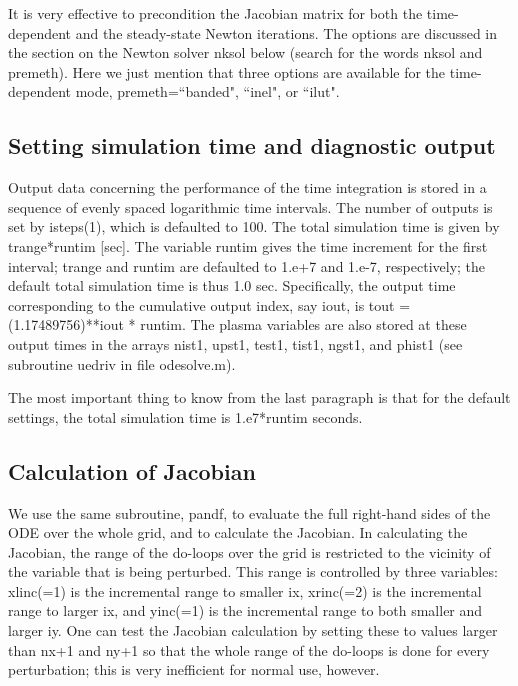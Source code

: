 \documentclass [12pt]{article}
\begin{document}
It is very effective to precondition the Jacobian matrix for both the
time-dependent and the steady-state Newton iterations. The options are
discussed in the section on the Newton solver {\sf nksol} below (search for
the words nksol and premeth). Here we just mention that three options are
available for the time-dependent mode, {\sf premeth=``banded", ``inel", or
``ilut"}.

\subsection{Setting simulation time and diagnostic output}

Output data concerning the performance of the time integration is
stored in a sequence of evenly spaced logarithmic time intervals.  The
number of outputs is set by isteps(1), which is defaulted to 100.  The
total simulation time is given by trange*runtim [sec].  The variable
runtim gives the time increment for the first interval; trange and
runtim are defaulted to 1.e+7 and 1.e-7, respectively; the default
total simulation time is thus 1.0 sec.  Specifically, the output time
corresponding to the cumulative output index, say iout, is tout =
(1.17489756)**iout * runtim.  The plasma variables are also stored at
these output times in the arrays nist1, upst1, test1, tist1, ngst1,
and phist1 (see subroutine uedriv in file odesolve.m).

The most important thing to know from the last paragraph is that for the
default settings, the total simulation time is 1.e7*runtim seconds.

\subsection{Calculation of Jacobian}

We use the same subroutine, pandf, to evaluate the full right-hand sides
of the ODE over the whole grid, and to calculate the Jacobian.  In
calculating the Jacobian, the range of the do-loops over the grid is
restricted to the vicinity of the variable that is being perturbed.  This
range is controlled by three variables: xlinc(=1) is the incremental range
to smaller ix, xrinc(=2) is the incremental range to larger ix, and
yinc(=1) is the incremental range to both smaller and larger iy.  One can
test the Jacobian calculation by setting these to values larger than nx+1
and ny+1 so that the whole range of the do-loops is done for every
perturbation; this is very inefficient for normal use, however.
\end{document}
